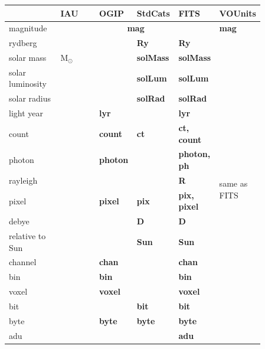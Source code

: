 \documentclass[11pt,notitlepage,onecolumn]{ivoa}
\newcommand{\unit}[1]{\textbf{\textsf{\color{orange}#1}}}
\begin{document}
\begin{table}[ht]
\begin{tabular}{|p{0.2\linewidth}|p{0.15\linewidth}|p{0.12\linewidth}|p{0.12\linewidth}|p{0.12\linewidth}|p{0.15\linewidth}|}
\hline
    & IAU & OGIP  & StdCats & FITS  & VOUnits\\\hline
    magnitude & \multicolumn{4}{c|}{\unit{mag}} & \unit{mag}\\\hline
    rydberg & \unit{} & \unit{} & \unit{Ry} & \unit{Ry} & \multirow{19}{0.15\linewidth}{same as FITS} \\\hline
    solar mass & \unit{$\mathrm{M}_\odot$} &  & \unit{solMass} & \unit{solMass} &\\\cline{1-5}
    solar luminosity & \unit{} & \unit{} & \unit{solLum} & \unit{solLum} &\\\cline{1-5}
    solar radius & \unit{} & \unit{} & \unit{solRad} & \unit{solRad} &\\\cline{1-5}
    light year & \unit{} & \unit{lyr} & \unit{} & \unit{lyr} &\\\cline{1-5}
    count & \unit{} & \unit{count} & \unit{ct} & \unit{ct, count} &\\\cline{1-5}
    photon & \unit{} & \unit{photon} & \unit{} & \unit{photon, ph} &\\\cline{1-5}
    rayleigh & \unit{} & \unit{} & \unit{} & \unit{R} &\\\cline{1-5}
    pixel & \unit{} & \unit{pixel} & \unit{pix} & \unit{pix, pixel} &\\\cline{1-5}
    debye & \unit{} & \unit{} & \unit{D} & \unit{D} &\\\cline{1-5}
    relative to Sun & \unit{} & \unit{} & \unit{Sun} & \unit{Sun} &\\\cline{1-5}
    channel & \unit{} & \unit{chan} & \unit{} & \unit{chan} &\\\cline{1-5}
    bin & \unit{} & \unit{bin} & \unit{} & \unit{bin} &\\\cline{1-5}
    voxel & \unit{} & \unit{voxel} & \unit{} & \unit{voxel} &\\\cline{1-5}
    bit & \unit{} & \unit{} & \unit{bit} & \unit{bit} &\\\cline{1-5}
    byte & \unit{} & \unit{byte} & \unit{byte} & \unit{byte} &\\\cline{1-5}
    adu & \unit{} & \unit{} & \unit{} & \unit{adu} &\\\cline{1-5}

\end{tabular}
\end{table}
\end{document}
